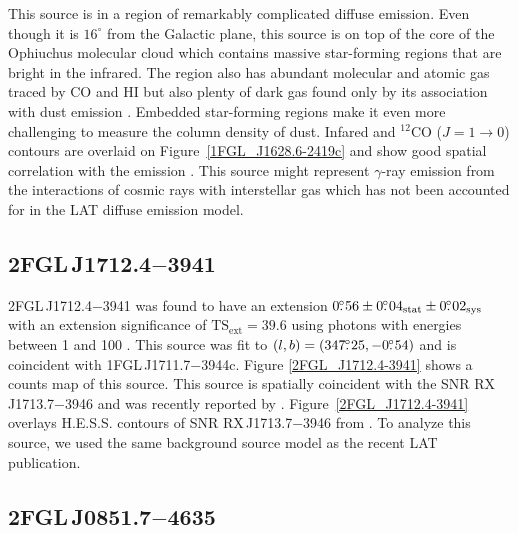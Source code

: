 \documentclass[12pt,preprint]{aastex}
\newcommand{\gev}{\text{GeV}\xspace}
\newcommand{\tev}{\text{TeV}\xspace}
\newcommand{\tsext}{{\ensuremath{\text{TS}_{\text{ext}}}}\xspace}
\newcommand{\sys}{\text{sys}\xspace}
\newcommand{\stat}{\text{stat}\xspace}
\newcommand{\degree}{^\circ\xspace}
\begin{document}
This source is in a region of remarkably complicated diffuse emission.
Even though it is $16\degree$ from the Galactic plane, this source is on
top of the core of the Ophiuchus molecular cloud which contains massive
star-forming regions that are bright in the infrared.  The region also has
abundant molecular and atomic gas traced by CO and HI but also plenty of
dark gas found only by its association with dust emission
\citep{isabelle_dark_gass}. Embedded star-forming regions make it even
more challenging to measure the column density of dust.  Infared and 
${}^{12}\text{CO}$ ($J=1\rightarrow 0$)
contours are overlaid on Figure~\ref{1FGL_J1628.6-2419c} and show good
spatial correlation with the \gev emission \citep{iras_rho_ophiuci,co_rho_ophiuci}.
This source might 
represent $\gamma$-ray emission from the interactions of cosmic rays with
interstellar gas which has not been accounted for in the LAT diffuse
emission model.

\subsection{2FGL\,J1712.4$-$3941}
\label{section_2FGL_J1712.4-3941}


2FGL\,J1712.4$-$3941 was found 
to have an extension $0\fdg56\pm0\fdg04_\stat\pm0\fdg02_\sys$
with an extension significance of $\tsext=39.6$
using 
photons with energies between
1 \gev and 100 \gev.  This source was
fit to $(l,b)=(347\mbox{$.\!\!^\circ$}25,-0\mbox{$.\!\!^\circ$}54)$ and is coincident
with 1FGL\,J1711.7$-$3944c.
Figure \ref{2FGL_J1712.4-3941} shows a counts map of this source.
This source is spatially coincident with the SNR RX\,J1713.7$-$3946
and was recently reported by \cite{rx_j1713_lat}.  
Figure~\ref{2FGL_J1712.4-3941} overlays H.E.S.S. \tev contours of SNR 
RX\,J1713.7$-$3946 from \cite{rx_j1713_hess}.  To analyze this source,
we used the same background source model as the recent LAT publication.

\subsection{2FGL\,J0851.7$-$4635}
\label{section_2FGL_J0851.7-4635}

\end{document}
